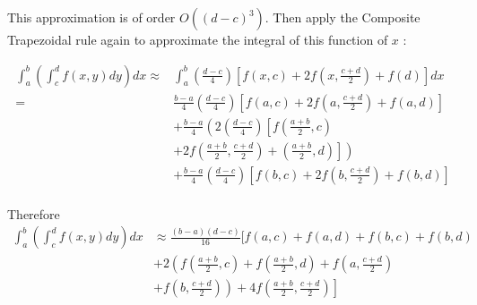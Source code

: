 This approximation is of order $O\left((d-c)^{3}\right)$. Then apply the Composite Trapezoidal rule again to approximate the integral of this function of $x$ :

$$
\begin{aligned}
\int_{a}^{b}\left(\int_{c}^{d} f(x, y) d y\right) d x \approx & \int_{a}^{b}\left(\frac{d-c}{4}\right)\left[f(x, c)+2 f\left(x, \frac{c+d}{2}\right)+f(d)\right] d x \\
= & \frac{b-a}{4}\left(\frac{d-c}{4}\right)\left[f(a, c)+2 f\left(a, \frac{c+d}{2}\right)+f(a, d)\right] \\
& +\frac{b-a}{4}\left(2 ( \frac { d - c } { 4 } ) \left[f\left(\frac{a+b}{2}, c\right)\right.\right. \\
& \left.\left.+2 f\left(\frac{a+b}{2}, \frac{c+d}{2}\right)+\left(\frac{a+b}{2}, d\right)\right]\right) \\
& +\frac{b-a}{4}\left(\frac{d-c}{4}\right)\left[f(b, c)+2 f\left(b, \frac{c+d}{2}\right)+f(b, d)\right] \\
\end{aligned}
$$

Therefore
$$
\begin{aligned}
\int_{a}^{b}\left(\int_{c}^{d} f(x, y) d y\right) d x &\approx 
\frac{(b-a)(d-c)}{16}[f(a, c)+f(a, d)+f(b, c)+f(b, d) \\
& +2\left(f\left(\frac{a+b}{2}, c\right)+f\left(\frac{a+b}{2}, d\right)+f\left(a, \frac{c+d}{2}\right)\right. \\
& \left.\left.+f\left(b, \frac{c+d}{2}\right)\right)+4 f\left(\frac{a+b}{2}, \frac{c+d}{2}\right)\right]
\end{aligned}
$$

